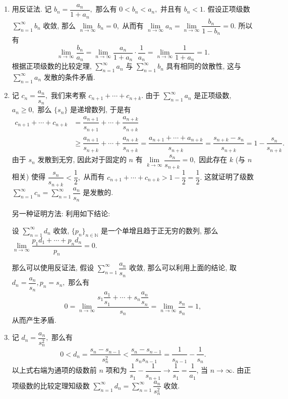 \begin{solution}
\begin{enumerate}
\item 用反证法. 记 $b_n = \dfrac{a_n}{1 + a_n},$ 那么有 $0 < b_n < a_n,$ 并且有 $b_n < 1.$ 假设正项级数 $\sum\limits_{n=1}^{\infty} b_n$ 收敛, 那么 $\lim\limits_{n \to \infty} b_n = 0,$ 从而有 $\lim\limits_{n \to \infty} a_n = \lim\limits_{n \to \infty} \dfrac{b_n}{1 - b_n} = 0.$ 所以有
\[\lim\limits_{n \to \infty} \dfrac{b_n}{a_n} = \lim\limits_{n \to \infty} \dfrac{a_n}{1 + a_n} \cdot \dfrac{1}{a_n} = \lim\limits_{n \to \infty} \dfrac{1}{1 + a_n} = 1.\]
根据正项级数的比较定理, $\sum\limits_{n=1}^{\infty} a_n$ 与 $\sum\limits_{n=1}^{\infty} b_n$ 具有相同的敛散性, 这与 $\sum\limits_{n=1}^{\infty} a_n$ 发散的条件矛盾.
\item 记 $c_n = \dfrac{a_n}{s_n},$ 我们来考察 $c_{n + 1} + \cdots + c_{n + k}.$ 由于 $\sum\limits_{n=1}^{\infty} a_n$ 是正项级数, $a_n \geqslant 0,$ 那么 $\{s_n\}$ 是递增数列, 于是有
\begin{align*}
  c_{n + 1} + \cdots + c_{n + k} & = \dfrac{a_{n + 1}}{s_{n + 1}} + \cdots + \dfrac{a_{n + k}}{s_{n + k}} \\
  & \geqslant \dfrac{a_{n + 1}}{s_{n + k}} + \cdots + \dfrac{a_{n + k}}{s_{n + k}}= \dfrac{a_{n + 1} + \cdots + a_{n + k}}{s_{n + k}} = \dfrac{s_{n + k} - s_{n}}{s_{n + k}} = 1 - \dfrac{s_{n}}{s_{n + k}}.
\end{align*}
由于 $s_n$ 发散到无穷, 因此对于固定的 $n$ 有 $\lim\limits_{k \to \infty} \dfrac{s_{n}}{s_{n + k}} = 0,$ 因此存在 $k$ (与 $n$ 相关) 使得 $\dfrac{s_{n}}{s_{n + k}} < \dfrac{1}{2},$ 从而有 $c_{n + 1} + \cdots + c_{n + k} > 1 - \dfrac{1}{2} = \dfrac{1}{2}.$ 这就证明了级数 $\sum\limits_{n=1}^{\infty} c_n = \sum\limits_{n=1}^{\infty} \dfrac{a_n}{s_n}$ 是发散的.

另一种证明方法: 利用如下结论:

设 $\sum\limits_{n=1}^\infty d_n$ 收敛, $\{ p_n \}_{n \in \mathbb{N}}$ 是一个单增且趋于正无穷的数列, 那么 $\lim\limits_{n\to\infty} \dfrac{p_1d_1 + \cdots + p_nd_n}{p_n} = 0.$

那么可以使用反证法, 假设 $\sum\limits_{n=1}^{\infty} \dfrac{a_n}{s_n}$ 收敛, 那么可以利用上面的结论, 取 $d_n = \dfrac{a_n}{s_n}, p_n = s_n,$ 那么有
\[0 = \lim\limits_{n\to\infty} \dfrac{s_1 \dfrac{a_1}{s_1} + \cdots + s_n \dfrac{a_n}{s_n}}{s_n} = \lim\limits_{n\to\infty} \dfrac{s_n}{s_n} = 1,\]
从而产生矛盾.
\item 记 $d_n = \dfrac{a_n}{s_n^2},$ 那么有
\[0 < d_n = \dfrac{s_n - s_{n - 1}}{s_n^2} < \dfrac{s_n - s_{n - 1}}{s_n s_{n - 1}} = \dfrac{1}{s_{n - 1}} - \dfrac{1}{s_n}.\]
以上式右端为通项的级数前 $n$ 项和为 $\dfrac{1}{s_1} - \dfrac{1}{s_{n + 1}} \to \dfrac{1}{s_1} = \dfrac{1}{a_1}$, 当 $n \to \infty.$ 由正项级数的比较定理知级数 $\sum\limits_{n=1}^{\infty} d_n = \sum\limits_{n=1}^{\infty} \dfrac{a_n}{s_n^2}$ 收敛.
\end{enumerate}
\end{solution}

